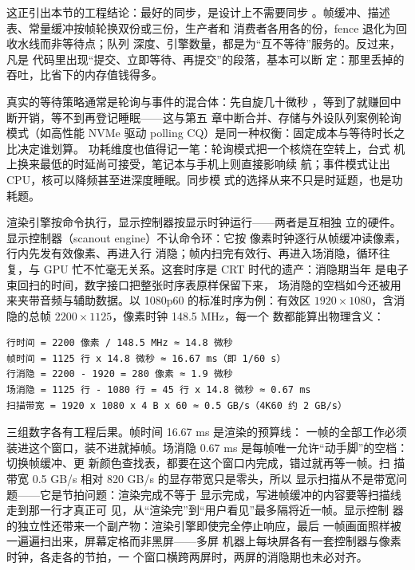 
这正引出本节的工程结论：最好的同步，是设计上不需要同步
。帧缓冲、描述表、常量缓冲按帧轮换双份或三份，生产者和
消费者各用各的份，fence 退化为回收水线而非等待点；队列
深度、引擎数量，都是为“互不等待”服务的。反过来，凡是
代码里出现“提交、立即等待、再提交”的段落，基本可以断
定：那里丢掉的吞吐，比省下的内存值钱得多。

真实的等待策略通常是轮询与事件的混合体：先自旋几十微秒
，等到了就赚回中断开销，等不到再登记睡眠——这与第五
章中断合并、存储与外设队列案例轮询模式（如高性能 NVMe 驱动 polling
CQ）是同一种权衡：固定成本与等待时长之比决定谁划算。
功耗维度也值得记一笔：轮询模式把一个核烧在空转上，台式
机上换来最低的时延尚可接受，笔记本与手机上则直接影响续
航；事件模式让出 CPU，核可以降频甚至进深度睡眠。同步模
式的选择从来不只是时延题，也是功耗题。

渲染引擎按命令执行，显示控制器按显示时钟运行——两者是互相独
立的硬件。显示控制器（scanout engine）不认命令环：它按
像素时钟逐行从帧缓冲读像素，行内先发有效像素、再进入行
消隐；帧内扫完有效行、再进入场消隐，循环往复，与 GPU
忙不忙毫无关系。这套时序是 CRT 时代的遗产：消隐期当年
是电子束回扫的时间，数字接口把整张时序表原样保留下来，
场消隐的空档如今还被用来夹带音频与辅助数据。以
1080p60 的标准时序为例：有效区 $1920\times1080$，含消
隐的总帧 $2200\times1125$，像素时钟 148.5 MHz，每一个
数都能算出物理含义：

\begin{lstlisting}
行时间 = 2200 像素 / 148.5 MHz ≈ 14.8 微秒
帧时间 = 1125 行 x 14.8 微秒 ≈ 16.67 ms（即 1/60 s）
行消隐 = 2200 - 1920 = 280 像素 ≈ 1.9 微秒
场消隐 = 1125 行 - 1080 行 = 45 行 x 14.8 微秒 ≈ 0.67 ms
扫描带宽 = 1920 x 1080 x 4 B x 60 ≈ 0.5 GB/s（4K60 约 2 GB/s）
\end{lstlisting}

三组数字各有工程后果。帧时间 16.67 ms 是渲染的预算线：
一帧的全部工作必须装进这个窗口，装不进就掉帧。场消隐
0.67 ms 是每帧唯一允许“动手脚”的空档：切换帧缓冲、更
新颜色查找表，都要在这个窗口内完成，错过就再等一帧。扫
描带宽 0.5 GB/s 相对 820 GB/s 的显存带宽只是零头，所以
显示扫描从不是带宽问题——它是节拍问题：渲染完成不等于
显示完成，写进帧缓冲的内容要等扫描线走到那一行才真正可
见，从“渲染完”到“用户看见”最多隔将近一帧。显示控制
器的独立性还带来一个副产物：渲染引擎即使完全停止响应，最后
一帧画面照样被一遍遍扫出来，屏幕定格而非黑屏——多屏
机器上每块屏各有一套控制器与像素时钟，各走各的节拍，一
个窗口横跨两屏时，两屏的消隐期也未必对齐。

